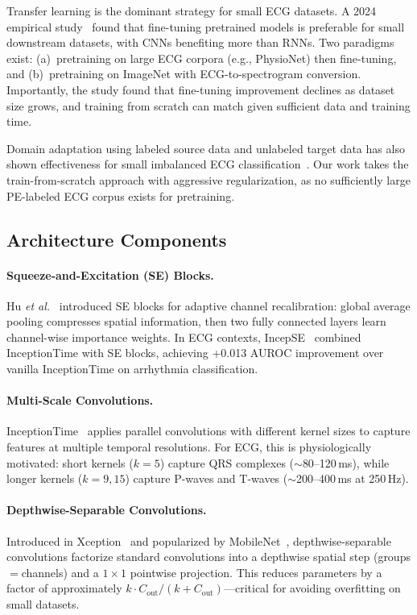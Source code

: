 \documentclass[11pt,a4paper]{article}
\newcommand{\etal}{\textit{et al.}}
\begin{document}
Transfer learning is the dominant strategy for small ECG datasets. A 2024 empirical study~\cite{transferecg2024} found that fine-tuning pretrained models is preferable for small downstream datasets, with CNNs benefiting more than RNNs. Two paradigms exist: (a)~pretraining on large ECG corpora (e.g., PhysioNet) then fine-tuning, and (b)~pretraining on ImageNet with ECG-to-spectrogram conversion. Importantly, the study found that fine-tuning improvement declines as dataset size grows, and training from scratch can match given sufficient data and training time.

Domain adaptation using labeled source data and unlabeled target data has also shown effectiveness for small imbalanced ECG classification~\cite{transferecg2024}. Our work takes the train-from-scratch approach with aggressive regularization, as no sufficiently large PE-labeled ECG corpus exists for pretraining.

\subsection{Architecture Components}

\paragraph{Squeeze-and-Excitation (SE) Blocks.}
Hu \etal~\cite{hu2018} introduced SE blocks for adaptive channel recalibration: global average pooling compresses spatial information, then two fully connected layers learn channel-wise importance weights. In ECG contexts, IncepSE~\cite{incepse2023} combined InceptionTime with SE blocks, achieving +0.013 AUROC improvement over vanilla InceptionTime on arrhythmia classification.

\paragraph{Multi-Scale Convolutions.}
InceptionTime~\cite{ismail2020} applies parallel convolutions with different kernel sizes to capture features at multiple temporal resolutions. For ECG, this is physiologically motivated: short kernels ($k=5$) capture QRS complexes ($\sim$80--120\,ms), while longer kernels ($k=9, 15$) capture P-waves and T-waves ($\sim$200--400\,ms at 250\,Hz).

\paragraph{Depthwise-Separable Convolutions.}
Introduced in Xception~\cite{chollet2017} and popularized by MobileNet~\cite{howard2017}, depthwise-separable convolutions factorize standard convolutions into a depthwise spatial step (groups$=$channels) and a $1\times1$ pointwise projection. This reduces parameters by a factor of approximately $k \cdot C_{\text{out}} / (k + C_{\text{out}})$---critical for avoiding overfitting on small datasets.
\end{document}
